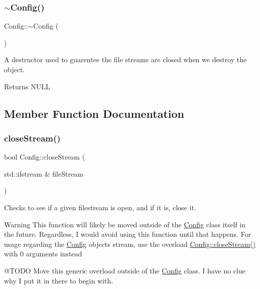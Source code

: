\subsubsection{\texorpdfstring{$\sim$Config()}{~Config()}}
{\footnotesize\ttfamily Config\+::$\sim$\+Config (\begin{DoxyParamCaption}{ }\end{DoxyParamCaption})}



A destructor used to guarentee the file streams are closed when we destroy the object. 

\begin{DoxyReturn}{Returns}
N\+U\+LL 
\end{DoxyReturn}


\subsection{Member Function Documentation}
\mbox{\label{classConfig_a8be2edef6f43770bf53f3ec517a74969}} 
\subsubsection{\texorpdfstring{closeStream()}{closeStream()}\hspace{0.1cm}{\footnotesize\ttfamily [1/2]}}
{\footnotesize\ttfamily bool Config\+::close\+Stream (\begin{DoxyParamCaption}\item[{std\+::ifstream \&}]{file\+Stream }\end{DoxyParamCaption})}



Checks to see if a given filestream is open, and if it is, close it. 

\begin{DoxyWarning}{Warning}
This function will likely be moved outside of the \mbox{\hyperlink{classConfig}{Config}} class itself in the future. Regardless, I would avoid using this function until that happens. For usage regarding the \mbox{\hyperlink{classConfig}{Config}} object\textquotesingle{}s stream, use the overload \mbox{\hyperlink{classConfig_a1a6e966edae9532a37f48553e43274f6}{Config\+::close\+Stream()}} with 0 arguments instead
\end{DoxyWarning}
@\+T\+O\+DO Move this generic overload outside of the \mbox{\hyperlink{classConfig}{Config}} class. I have no clue why I put it in there to begin with.


